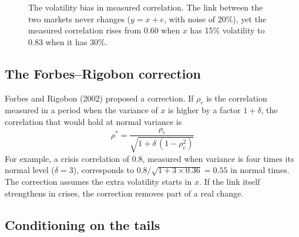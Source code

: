 \begin{figure}[htbp]
\centering
{}
\caption{The volatility bias in measured correlation. The link between the two markets never changes ($y = x + e$, with noise of 20\%), yet the measured correlation rises from 0.60 when $x$ has 15\% volatility to 0.83 when it has 30\%.}
\label{fig:20-bias}
\end{figure}

\subsection{The Forbes--Rigobon correction}

Forbes and Rigobon (2002) proposed a correction. If $\rho_c$ is the correlation measured in a period when the variance of $x$ is higher by a factor $1 + \delta$, the correlation that would hold at normal variance is
\begin{equation}
  \rho^* = \frac{\rho_c}{\sqrt{1 + \delta\,(1 - \rho_c^2)}}
  \label{eq:20-fr}
\end{equation}
For example, a crisis correlation of 0.8, measured when variance is four times its normal level ($\delta = 3$), corresponds to $0.8/\sqrt{1 + 3 \times 0.36} = 0.55$ in normal times. The correction assumes the extra volatility starts in $x$. If the link itself strengthens in crises, the correction removes part of a real change.

\subsection{Conditioning on the tails}

